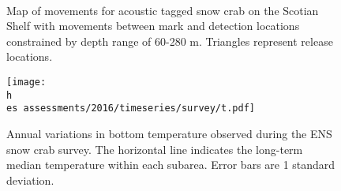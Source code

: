 \documentclass[11pt]{article}
\newcommand{\h}{\string~/}
\newcommand{\es}{bio.data/bio.snowcrab/}
\begin{document}
\begin{figure}
\centering
{}\
\caption{Map of movements for acoustic tagged snow crab on the Scotian Shelf with movements between mark and detection locations constrained by depth range of 60-280 m. Triangles represent release locations.}
\end{figure}
\clearpage

\begin{figure}
\centering
\texttt{[image: \\h \\es assessments/2016/timeseries/survey/t.pdf]} %
\caption{Annual variations in bottom temperature observed during the ENS snow crab survey. The horizontal line indicates the long-term median temperature within each subarea. Error bars are 1 standard deviation. }
\end{figure}
\clearpage
\end{document}
